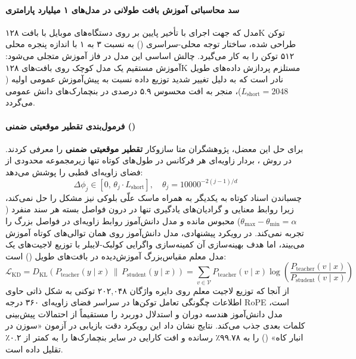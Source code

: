 \item {}

\paragraph*{سد محاسباتی آموزش بافت طولانی در مدل‌های ۱ میلیارد پارامتری}
مدل  \cite{huber2025mobilellmpro} که جهت اجرای با تأخیر پایین بر روی دستگاه‌های موبایل با بافت ۱۲۸K توکن طراحی شده، ساختار توجه محلی-سراسری () به نسبت ۳ به ۱ با اندازه پنجره محلی ۵۱۲ توکن را به کار می‌گیرد. چالش اساسی این مدل در فاز آموزش متجلی می‌شود: آموزش مستقیم یک مدل کوچک روی بافت‌های ۱۲۸K مستلزم پردازش داده‌های طویل نادر است که به دلیل تغییر شدید توزیع داده نسبت به پیش‌آموزش عمومی اولیه ($L_{\text{short}} = 2048$)، منجر به افت محسوس ۵.۹ درصدی در بنچمارک‌های دانش عمومی می‌گردد.

\paragraph*{فرمول‌بندی تقطیر موقعیتی ضمنی ()}
برای حل این معضل، پژوهشگران متا سازوکار \textbf{تقطیر موقعیتی ضمنی} را معرفی کردند. در روش ، بردار زاویه‌ای هر فرکانس در طول‌های کوتاه تنها زیرمجموعه محدودی از فضای زاویه‌ای قطبی را پوشش می‌دهد:
\begin{equation}
    \Delta \phi_j \in [0, \, \theta_j \cdot L_{\text{short}}], \quad \theta_j = 10000^{-2(j-1)/d}
\end{equation}
چسباندن اسناد کوتاه به یکدیگر به همراه ماسک علّی بلوکی نیز مشکل را حل نمی‌کند، زیرا روابط معنایی و گرادیان‌های یادگیری تنها در درون فواصل بسته هر سند منفرد ($\theta_{\max} - \theta_{\min} = \alpha$) محبوس مانده و مدل دانش‌آموز روابط زاویه‌ای در فواصل بزرگ را تجربه نمی‌کند. در رویکرد پیشنهادی، مدل دانش‌آموز روی همان توالی‌های کوتاه آموزش می‌بیند، اما هدف بهینه‌سازی آن کمینه‌سازی واگرایی کولبک-لایبلر با توزیع لاجیت‌های یک مدل معلم مقیاس‌بزرگ آموزش‌دیده در بافت‌های طویل () است:
\begin{equation}
    \mathcal{L}_{\text{KD}} = D_{\text{KL}}\left( P_{\text{teacher}}(y \mid x) \,\|\, P_{\text{student}}(y \mid x) \right) = \sum_{v \in \mathcal{V}} P_{\text{teacher}}(v \mid x) \log \left( \frac{P_{\text{teacher}}(v \mid x)}{P_{\text{student}}(v \mid x)} \right)
\end{equation}
از آنجا که توزیع لاجیت معلم روی دایره واژگان ۲۰۲,۰۴۸ توکنی به شکل ذاتی حاوی اطلاعات چگونگی تعامل توکن‌ها در سراسر فضای زاویه‌ای ۳۶۰ درجه RoPE است، مدل دانش‌آموز هندسه دوران و استدلال دوربرد را مستقیماً از احتمالات پیش‌بینی کلمات بعدی جذب می‌کند. نتایج نشان داد این رویکرد دقت بازیابی در آزمون «سوزن در انبار کاه» () را به ۹۹.۷۸٪ رسانده و افت کارایی در سایر بنچمارک‌ها را به کمتر از ۰.۲٪ تقلیل داده است.

